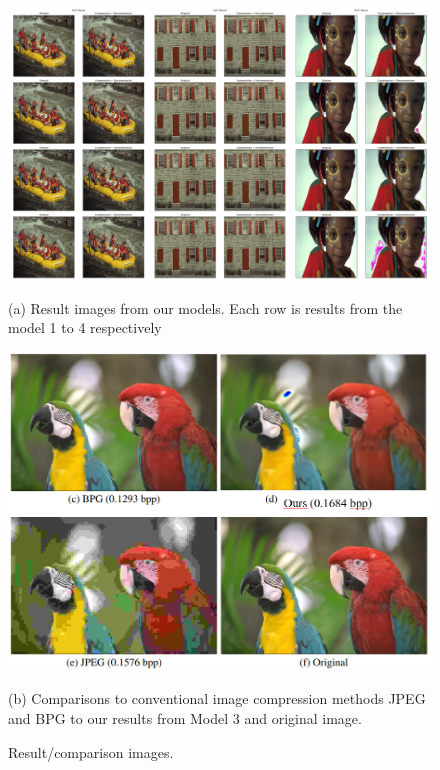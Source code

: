 \documentclass{article}
\begin{document}
\pagebreak

\begin{figure}[h!]
\centering
\begin{minipage}[b]{.8\linewidth}
    \centering
    \includegraphics[width=\linewidth]{reconstruction.png}
    \centerline{(a)  Result images from our models. Each row is results from the model 1 to 4 respectively}\medskip

\end{minipage}
\begin{minipage}[b]{.5\linewidth}
    \centering
    \includegraphics[width=\linewidth]{comparison.png}
    \centerline{(b) Comparisons to conventional image compression methods JPEG and BPG to our results from Model 3 and original image.}\medskip
\end{minipage}
    \caption{Result/comparison images.}
    \label{fig:images}
\end{figure}
\end{document}
